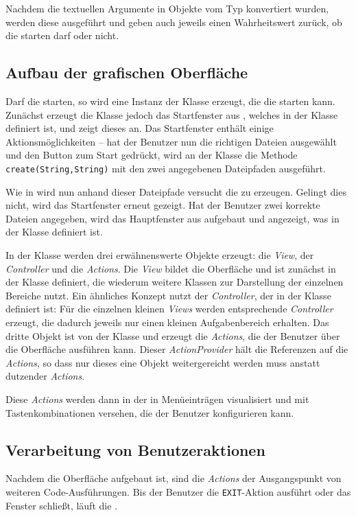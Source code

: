 Nachdem die textuellen Argumente in Objekte vom Typ  konvertiert wurden, werden diese ausgeführt und geben auch jeweils einen Wahrheitswert zurück, ob die \mdg starten darf oder nicht.

\subsection{Aufbau der grafischen Oberfläche}
Darf die \mdg starten, so wird eine Instanz der Klasse  erzeugt, die die \mdg starten kann. Zunächst erzeugt die Klasse jedoch das Startfenster aus , welches in der Klasse  definiert ist, und zeigt dieses an. Das Startfenster enthält einige Aktionsmöglichkeiten -- hat der Benutzer nun die richtigen Dateien ausgewählt und den Button zum Start gedrückt, wird an der Klasse  die Methode \texttt{create(String,String)} mit den zwei angegebenen Dateipfaden ausgeführt.

Wie in  wird nun anhand dieser Dateipfade versucht die \mic zu erzeugen. Gelingt dies nicht, wird das Startfenster erneut gezeigt. Hat der Benutzer zwei korrekte Dateien angegeben, wird das Hauptfenster aus  aufgebaut und angezeigt, was in der Klasse  definiert ist.

In der Klasse  werden drei erwähnenswerte Objekte erzeugt: die \emph{View}, der \emph{Controller} und die \emph{Actions}. Die \emph{View} bildet die Oberfläche und ist zunächst in der Klasse  definiert, die wiederum weitere Klassen zur Darstellung der einzelnen Bereiche nutzt. Ein ähnliches Konzept nutzt der \emph{Controller}, der in der Klasse  definiert ist: Für die einzelnen kleinen \emph{Views} werden entsprechende \emph{Controller} erzeugt, die dadurch jeweils nur einen kleinen Aufgabenbereich erhalten. Das dritte Objekt ist von der Klasse  und erzeugt die \emph{Actions}, die der Benutzer über die Oberfläche ausführen kann. Dieser \emph{ActionProvider} hält die Referenzen auf die \emph{Actions}, so dass nur dieses eine Objekt weitergereicht werden muss anstatt dutzender \emph{Actions}.

Diese \emph{Actions} werden dann in der  in Menüeinträgen visualisiert und mit Tastenkombinationen versehen, die der Benutzer konfigurieren kann.

\subsection{Verarbeitung von Benutzeraktionen}
Nachdem die Oberfläche aufgebaut ist, sind die \emph{Actions} der Ausgangspunkt von weiteren Code-Ausführungen. Bis der Benutzer die \texttt{EXIT}-Aktion ausführt oder das Fenster schließt, läuft die \mdg.

